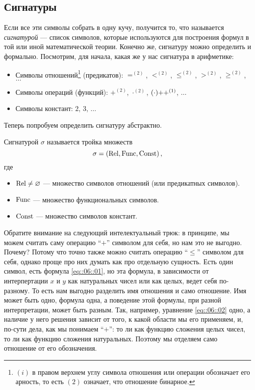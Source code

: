 \subsection{Сигнатуры}

Если все эти символы собрать в одну кучу, получится то, что называется {\it сигнатурой} --- список символов, которые используются для построения формул в той или иной математической теории.
Конечно же, сигнатуру можно определить и формально.
Посмотрим, для начала, какая же у нас сигнатура в арифметике:
\begin{itemize}
    \item Символы отношений\footnote{$(i)$ в правом верхнем углу символа отношения или операции обозначает его арность, то есть $(2)$ означает, что отношение бинарное.} (предикатов): $=^{(2)}$, $<^{(2)}$, $\leqslant^{(2)}$, $>^{(2)}$, $\geqslant^{(2)}$, $\ldots$
    \item Символы операций (функций): $+^{(2)}$, $\cdot^{(2)}$, $(\cdot){++}^{(1)}$, $\ldots$
    \item Символы констант: $2$, $3$, $\ldots$
\end{itemize}
Теперь попробуем определить сигнатуру абстрактно.
\begin{definition}
    Сигнатурой $\sigma$ называется тройка множеств
    $$
        \sigma = \left(\mathrm{Rel}, \mathrm{Func}, \mathrm{Const}\right),
    $$
    где
    \begin{itemize}
        \item $\mathrm{Rel} \neq \varnothing$ --- множество символов отношений (или предикатных символов).
        \item $\mathrm{Func}$ --- множество функциональных символов.
        \item $\mathrm{Const}$ --- множество символов констант.
    \end{itemize}
\end{definition}
Обратите внимание на следующий интелектуальный трюк: в принципе, мы можем считать саму операцию \enquote{$+$} символом для себя, но нам это не выгодно.
Почему?
Потому что точно также можно считать операцию \enquote{$\leqslant$} символом для себя, однако проще про них думать как про отдельную сущность.
Есть один символ, есть формула \eqref{eq::06::01}, но эта формула, в зависимости от интерпертации $x$ и $y$ как натуральных чисел или как целых, ведет себя по-разному.
То есть нам выгодно разделить имя отношения и само отношение.
Имя может быть одно, формула одна, а поведение этой формулы, при разной интерпретации, может быть разным.
Так, например, уравнение \eqref{eq::06::02} одно, а наличие у него решения зависит от того, к какой области мы его применяем, и, по-сути дела, как мы понимаем \enquote{$+$}: то ли как функцию сложения целых чисел, то ли как функцию сложения натуральных.
Поэтому мы отделяем само отношение от его обозначения.

